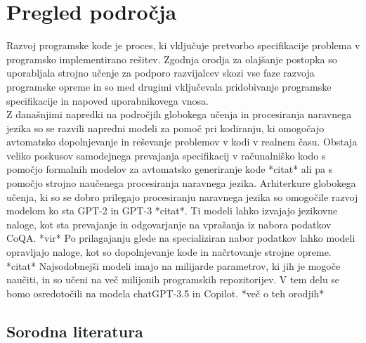 \documentclass[12pt,a4paper]{book}
\begin{document}
\chapter{Pregled področja}
Razvoj programske kode je proces, ki vključuje pretvorbo specifikacije problema v programsko implementirano rešitev. Zgodnja orodja za olajšanje postopka so uporabljala strojno učenje za podporo razvijalcev skozi vse faze razvoja programske opreme in so med drugimi vključevala pridobivanje programske specifikacije in napoved uporabnikovega vnosa. \textcite{zhang2003machine} \\
Z današnjimi napredki na področjih globokega učenja in procesiranja naravnega jezika so se razvili napredni modeli za pomoč pri kodiranju, ki omogočajo avtomatsko dopolnjevanje in reševanje problemov v kodi v realnem času.
Obstaja veliko poskusov samodejnega prevajanja specifikacij v računalniško kodo s pomočjo formalnih modelov za avtomatsko generiranje kode *citat* ali pa s pomočjo strojno naučenega procesiranja naravnega jezika. Arhiterkure globokega učenja, ki so se dobro prilegajo procesiranju naravnega jezika so omogočile razvoj modelom ko sta GPT-2 in GPT-3 *citat*. Ti modeli lahko izvajajo
jezikovne naloge, kot sta prevajanje in odgovarjanje na vprašanja iz nabora podatkov CoQA. *vir* Po prilagajanju glede na specializiran nabor podatkov lahko modeli opravljajo naloge, kot so dopolnjevanje kode in načrtovanje strojne opreme. *citat* Najsodobnejši modeli imajo na milijarde parametrov, ki jih je mogoče naučiti, in so učeni na več milijonih programskih repozitorijev. V tem delu se bomo osredotočili na modela chatGPT-3.5 in Copilot. *več o teh orodjih* \\
\section{Sorodna literatura}
\end{document}
